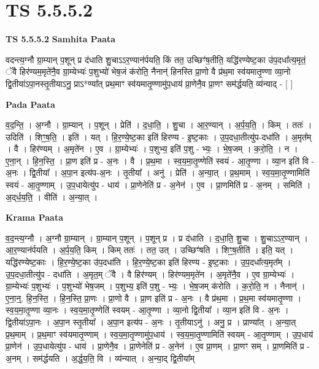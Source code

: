 \documentclass[17pt]{extarticle}
\begin{document}
\section{ TS 5.5.5.2 }

\textbf{TS 5.5.5.2 } \newline
\textbf{Samhita Paata} \newline

वदन्त्य॒ग्नौ ग्रा॒म्यान् प॒शून् प्र द॑धाति शु॒चाऽऽर॒ण्यान॑र्पयति॒ किं तत॒ उच्छिꣳ॑ष॒तीति॒ यद्धि॑रण्येष्ट॒का उ॑प॒दधा᳚त्य॒मृतं॒ ॅवै हिर॑ण्यम॒मृते॑नै॒व ग्रा॒म्येभ्यः॑ प॒शुभ्यो॑ भेष॒जं क॑रोति॒ नैनान्॑ हिनस्ति प्रा॒णो वै प्र॑थ॒मा स्व॑यमातृ॒ण्णा व्या॒नो द्वि॒तीया॑ऽपा॒नस्तृ॒तीयाऽनु॒ प्राऽ*ण्या᳚त् प्रथ॒माꣳ स्व॑यमातृ॒ण्णामु॑प॒धाय॑ प्रा॒णेनै॒व प्रा॒णꣳ सम॑र्द्धयति॒ व्य॑न्याद् - [  ] \newline

\textbf{Pada Paata} \newline

व॒द॒न्ति॒ । अ॒ग्नौ । ग्रा॒म्यान् । प॒शून् । प्रेति॑ । द॒धा॒ति॒ । शु॒चा । आ॒र॒ण्यान् । अ॒र्प॒य॒ति॒ । किम् । ततः॑ । उदिति॑ । शिꣳ॒॒ष॒ति॒ । इति॑ । यत् । हि॒र॒ण्ये॒ष्ट॒का इति॑ हिरण्य - इ॒ष्ट॒काः । उ॒प॒दधा॒तीत्यु॑प-दधा॑ति । अ॒मृत᳚म् । वै । हिर॑ण्यम् । अ॒मृते॑न । ए॒व । ग्रा॒म्येभ्यः॑ । प॒शुभ्य॒ इति॑ प॒शु - भ्यः॒ । भे॒ष॒जम् । क॒रो॒ति॒ । न । ए॒ना॒न् । हि॒न॒स्ति॒ । प्रा॒ण इति॑ प्र - अ॒नः । वै । प्र॒थ॒मा । स्व॒य॒मा॒तृ॒ण्णेति॑ स्वयं -  आ॒तृ॒ण्णा । व्या॒न इति॑ वि - अ॒नः । द्वि॒तीया᳚ । अ॒पा॒न इत्य॑प-अ॒नः । तृ॒तीया᳚ । अनु॑ । प्रेति॑ । अ॒न्या॒त् । प्र॒थ॒माम् । स्व॒य॒मा॒तृ॒ण्णामिति॑ स्वयं - आ॒तृ॒ण्णाम् । उ॒प॒धायेत्यु॑प - धाय॑ । प्रा॒णेनेति॑ प्र - अ॒नेन॑ । ए॒व । प्रा॒णमिति॑ प्र - अ॒नम् । समिति॑ । अ॒द्‌र्ध॒य॒ति॒ । वीति॑ । अ॒न्या॒त् ।  \newline


\textbf{Krama Paata} \newline

व॒द॒न्त्य॒ग्नौ । अ॒ग्नौ ग्रा॒म्यान् । ग्रा॒म्यान् प॒शून् । प॒शून् प्र । प्र द॑धाति । द॒धा॒ति॒ शु॒चा । शु॒चाऽऽर॒ण्यान् । आ॒र॒ण्यान॑र्पयति । अ॒र्प॒य॒ति॒ किम् । किम् ततः॑ । तत॒ उत् । उच्छिꣳ॑षति । शिꣳ॒॒ष॒तीति॑ । इति॒ यत् । यद्धि॑रण्येष्ट॒काः । हि॒र॒ण्ये॒ष्ट॒का उ॑प॒दधा॑ति । हि॒र॒ण्ये॒ष्ट॒का इति॑ हिरण्य - इ॒ष्ट॒काः । उ॒प॒दधा᳚त्य॒मृत᳚म् । उ॒प॒दधा॒तीत्यु॑प - दधा॑ति । अ॒मृत॒म् ॅवै । वै हिर॑ण्यम् । हिर॑ण्यम॒मृते॑न । अ॒मृते॑नै॒व । ए॒व ग्रा॒म्येभ्यः॑ । ग्रा॒म्येभ्यः॑ प॒शुभ्यः॑ । प॒शुभ्यो॑ भेष॒जम् । प॒शुभ्य॒ इति॑ प॒शु - भ्यः॒ । भे॒ष॒जम् क॑रोति । क॒रो॒ति॒ न । नैनान्॑ । ए॒ना॒न्॒. हि॒न॒स्ति॒ । हि॒न॒स्ति॒ प्रा॒णः । प्रा॒णो वै । प्रा॒ण इति॑ प्र - अ॒नः । वै प्र॑थ॒मा । प्र॒थ॒मा स्व॑यमातृ॒ण्णा । स्व॒य॒मा॒तृ॒ण्णा व्या॒नः । स्व॒य॒मा॒तृ॒ण्णेति॑ स्वयम् - आ॒तृ॒ण्णा । व्या॒नो द्वि॒तीया᳚ । व्या॒न इति॑ वि - अ॒नः । द्वि॒तीया॑ऽपा॒नः । अ॒पा॒न स्तृ॒तीया᳚ । अ॒पा॒न इत्य॑प - अ॒नः । तृ॒तीयाऽनु॑ । अनु॒ प्र । प्राण्या᳚त् । अ॒न्या॒त् प्र॒थ॒माम् । प्र॒थ॒माꣳ स्व॑यमातृ॒ण्णाम् । स्व॒य॒मा॒तृ॒ण्णामु॑प॒धाय॑ । स्व॒य॒मा॒तृ॒ण्णामिति॑ स्वयम् - आ॒तृ॒ण्णाम् । उ॒प॒धाय॑ प्रा॒णेन॑ । उ॒प॒धायेत्यु॑प - धाय॑ । प्रा॒णेनै॒व । प्रा॒णेनेति॑ प्र - अ॒नेन॑ । ए॒व प्रा॒णम् । प्रा॒णꣳ सम् । प्रा॒णमिति॑ प्र - अ॒नम् । सम॑र्द्धयति । अ॒र्द्ध॒य॒ति॒ वि । व्य॑न्यात् । अ॒न्या॒द् द्वि॒तीया᳚म् \newline
\end{document}
